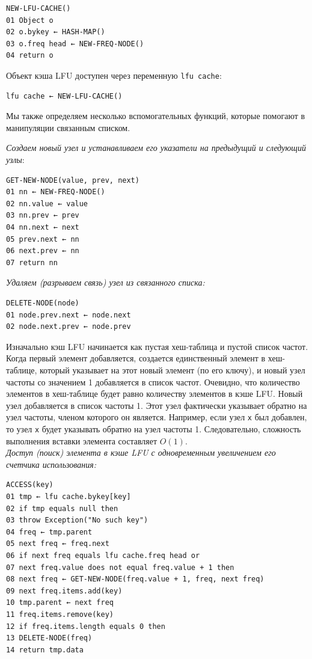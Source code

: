 \documentclass[a4paper, 12pt]{article}
\begin{document}
\begin{verbatim}
NEW-LFU-CACHE()
01 Object o
02 o.bykey ← HASH-MAP()
03 o.freq head ← NEW-FREQ-NODE()
04 return o
\end{verbatim}

Объект кэша LFU доступен через переменную \texttt{lfu cache}:
\begin{verbatim}
lfu cache ← NEW-LFU-CACHE()
\end{verbatim}

Мы также определяем несколько вспомогательных функций, которые помогают в манипуляции связанным списком.

\textit{Создаем новый узел и устанавливаем его указатели на предыдущий и следующий узлы}:
\begin{verbatim}
GET-NEW-NODE(value, prev, next)
01 nn ← NEW-FREQ-NODE()
02 nn.value ← value
03 nn.prev ← prev
04 nn.next ← next
05 prev.next ← nn
06 next.prev ← nn
07 return nn
\end{verbatim}

\textit{Удаляем (разрываем связь) узел из связанного списка:}
\begin{verbatim}
DELETE-NODE(node)
01 node.prev.next ← node.next
02 node.next.prev ← node.prev
\end{verbatim}

Изначально кэш LFU начинается как пустая хеш-таблица и пустой список частот. Когда первый элемент добавляется, создается единственный элемент в хеш-таблице, который указывает на этот новый элемент (по его ключу), и новый узел частоты со значением 1 добавляется в список частот. Очевидно, что количество элементов в хеш-таблице будет равно количеству элементов в кэше LFU. Новый узел добавляется в список частоты 1. Этот узел фактически указывает обратно на узел частоты, членом которого он является. Например, если узел \texttt{x} был добавлен, то узел \texttt{x} будет указывать обратно на узел частоты 1. Следовательно, сложность выполнения вставки элемента составляет $O(1)$. \\

\textit{Доступ (поиск) элемента в кэше LFU с одновременным увеличением его счетчика использования:}
\begin{verbatim}
ACCESS(key)
01 tmp ← lfu cache.bykey[key]
02 if tmp equals null then
03 throw Exception("No such key")
04 freq ← tmp.parent
05 next freq ← freq.next
06 if next freq equals lfu cache.freq head or
07 next freq.value does not equal freq.value + 1 then
08 next freq ← GET-NEW-NODE(freq.value + 1, freq, next freq)
09 next freq.items.add(key)
10 tmp.parent ← next freq
11 freq.items.remove(key)
12 if freq.items.length equals 0 then
13 DELETE-NODE(freq)
14 return tmp.data
\end{verbatim}
\end{document}

